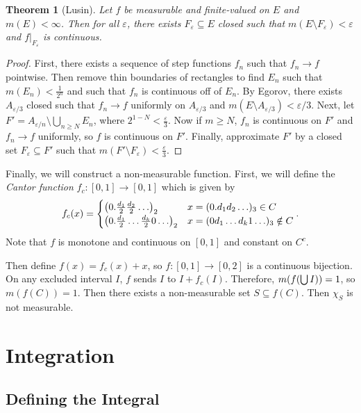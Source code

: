 \documentclass[leqno, openany]{memoir}
\newtheorem{thm}{Theorem}[chapter]
\theoremstyle{definition}
\theoremstyle{remark}
\theoremstyle{plain}
\theoremstyle{definition}
\theoremstyle{remark}
\newcommand{\ep}{\varepsilon}
\begin{document}
\begin{thm}[Lusin] Let $f$ be measurable and finite-valued on $E$ and $m(E) <
\infty$. Then for all $\ep$, there exists $F_{\ep} \subseteq E$ closed such
that $m(E \setminus F_{\ep}) < \ep$ and $f |_{F_{\ep}}$ is continuous.
\end{thm}

\begin{proof} First, there exists a sequence of step functions $f_n$ such that
    $f_n \to f$ pointwise. Then remove thin boundaries of rectangles to find
    $E_n$ such that $m(E_n) < \frac{1}{2^n}$ and such that $f_n$ is continuous
    off of $E_n$. By Egorov, there exists $A_{\ep/3}$ closed such that $f_n \to
    f$ uniformly on $A_{\ep/3}$ and $m(E \setminus A_{\ep/3}) < \ep/3$. Next,
    let $F' = A_{\ep/n} \setminus \bigcup_{n \geq N} E_n$, where $2^{1-N} <
    \frac{\ep}{3}$. Now if $m \geq N$, $f_n$ is continuous on $F'$ and $f_n \to
    f$ uniformly, so $f$ is continuous on $F'$. Finally, approximate $F'$ by a
    closed set $F_{\ep} \subseteq F'$ such that $m(F' \setminus F_{\ep}) <
    \frac{\ep}{3}$.  \end{proof}

Finally, we will construct a non-measurable function. First, we will define the
\textit{Cantor function} $f_c: [0,1] \to [0,1]$ which is given by \[ f_c(x) =
    \begin{cases} \qty(0.\frac{d_1}{2}\frac{d_2}{2}\ldots)_2 & x =
        (0.d_1d_2\ldots)_3 \in C \\
    \qty(0.\frac{d_1}{2}\ldots\frac{d_k}{2}0\ldots)_2 & x = (0d_1\ldots d_k 1
\ldots)_3 \notin C \end{cases}. \] Note that $f$ is monotone and continuous on
$[0,1]$ and constant on $C^c$.

Then define $f(x) = f_c(x) + x$, so $f: [0,1] \to [0,2]$ is a continuous
bijection. On any excluded interval $I$, $f$ sends $I$ to $I + f_c(I)$.
Therefore, $m\qty(f\qty(\bigcup I)) = 1$, so $m(f(C)) = 1$. Then there exists a
non-measurable set $S \subseteq f(C)$. Then $\chi_S$ is not measurable.

\chapter{Integration}%

\section{Defining the Integral}%
\end{document}
